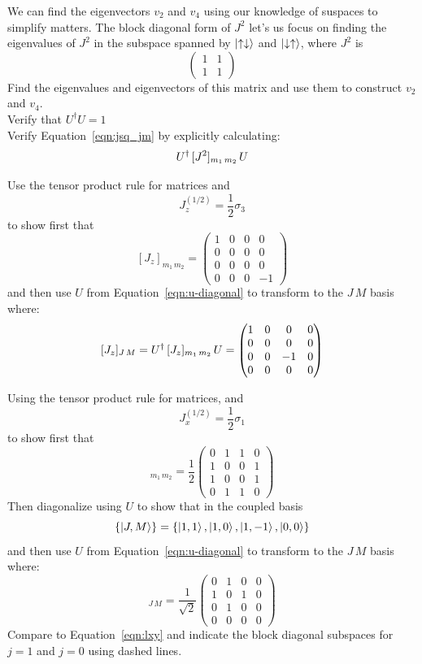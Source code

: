 \documentclass[12pt]{article}
\begin{document}
\exercise We can find the eigenvectors $v_2$ and $v_4$ using our
knowledge of suspaces to simplify matters.  The block diagonal form of
$J^2$ let's us focus on finding the eigenvalues of $J^2$ in the
subspace spanned by $\ket{\uparrow\downarrow}$ and
$\ket{\downarrow\uparrow}$, where $J^2$ is
$$\begin{pmatrix} 1 & 1 \\ 1 & 1\end{pmatrix}$$
Find the eigenvalues and eigenvectors of this matrix and use them to
construct $v_2$ and $v_4$.\\[5pt]

\exercise Verify that $U^\dagger U = 1$\\[5pt]
  
\exercise Verify Equation~\ref{eqn:jsq_jm} by explicitly calculating:
$$U^\dagger \, [J^2]_{m_1\,m_2} \, U\\[5pt]$$

\exercise Use the tensor product rule for matrices and
$$J_z^{(1/2)} = \frac{1}{2}\sigma_3$$
to show first that
$$[J_z]_{m_1\, m_2} = \begin{pmatrix}1&0&0&0\\0&0&0&0\\0&0&0&0\\0&0&0&-1\end{pmatrix}$$
and then use $U$ from Equation~\ref{eqn:u-diagonal} to transform to the $J\,M$ basis where:
$$[J_z]_{J\, M} = U^\dagger \, [J_z]_{m_1\, m_2} \, U = \begin{pmatrix}1&0&0&0\\0&0&0&0\\0&0&-1&0\\0&0&0&0\end{pmatrix} \\[5pt]\\[5pt]$$

\exercise Using the tensor product rule for matrices, and
$$J_x^{(1/2)} = \frac{1}{2}\sigma_1$$
to show first that 
\begin{equation*}
[J_x]_{m_1\, m_2} = \frac{1}{2}\begin{pmatrix}0&1&1&0\\1&0&0&1\\1&0&0&1\\0&1&1&0\end{pmatrix}
\end{equation*}
Then diagonalize using $U$ to show that in the coupled basis  
$$\{\ket{J,M}\} = \{\ket{1,1}, \ket{1,0}, \ket{1,-1}, \ket{0,0}\}$$
and then use $U$ from Equation~\ref{eqn:u-diagonal} to transform to the $J\,M$ basis where:
\begin{equation*}
[J_x]_{J\, M} = \frac{1}{\sqrt{2}}\begin{pmatrix}0&1&0&0\\1&0&1&0\\0&1&0&0\\0&0&0&0\end{pmatrix}
\end{equation*}
Compare to Equation~\ref{eqn:lxy} and indicate the block diagonal
subspaces for $j=1$ and $j=0$ using dashed lines.\\[5pt]
\end{document}
